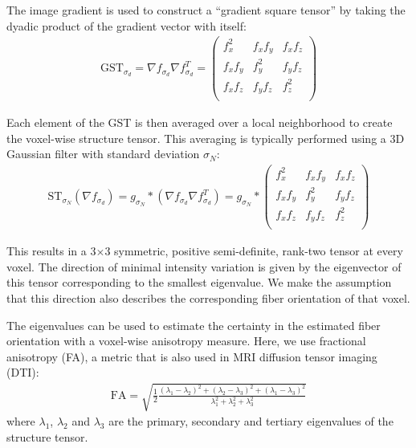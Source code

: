 \documentclass[11pt]{article}
\begin{document}
The image gradient is used to construct a ``gradient square tensor'' by taking
the dyadic product of the gradient vector with itself:
\begin{align}
  \label{eq:GST}
  \text{GST}_{\sigma_d} = \nabla f_{\sigma_d} \nabla f_{\sigma_d}^T =
  \begin{pmatrix}
    f_x^2 & f_x f_y & f_x f_z \\
    f_x f_y & f_y^2 & f_y f_z \\
    f_x f_z & f_y f_z & f_z^2 \\
  \end{pmatrix}
\end{align}

Each element of the GST is then averaged over a local neighborhood to create the
voxel-wise structure tensor. This averaging is typically performed using a 3D
Gaussian filter with standard deviation $\sigma_N$:
\begin{align}
  \label{eq:ST}
  \text{ST}_{\sigma_N}\left(\nabla f_{\sigma_d}\right) = g_{\sigma_N} \ast
  \left(\nabla f_{\sigma_d} \nabla f_{\sigma_d}^T \right) = g_{\sigma_N} \ast
  \begin{pmatrix}
    f_x^2 & f_x f_y & f_x f_z \\
    f_x f_y & f_y^2 & f_y f_z \\
    f_x f_z & f_y f_z & f_z^2 \\
  \end{pmatrix}
\end{align}

This results in a 3$\times$3 symmetric, positive semi-definite, rank-two tensor
at every voxel. The direction of minimal intensity variation is given by the
eigenvector of this tensor corresponding to the smallest eigenvalue. We make the
assumption that this direction also describes the corresponding fiber
orientation of that voxel.

The eigenvalues can be used to estimate the certainty in the estimated fiber
orientation with a voxel-wise anisotropy measure. Here, we use fractional
anisotropy (FA), a metric that is also used in MRI diffusion tensor imaging (DTI):
\begin{align}
  \label{eq:FA}
  \text{FA} = \sqrt{\frac{1}{2}\frac{(\lambda_1-\lambda_2)^2 + (\lambda_2-\lambda_3)^2 +
      (\lambda_1 - \lambda_3)^2}{\lambda_1^2 + \lambda_2^2 + \lambda_3^2}}
\end{align}
where $\lambda_1$, $\lambda_2$ and $\lambda_3$ are the primary, secondary and
tertiary eigenvalues of the structure tensor.
\end{document}

